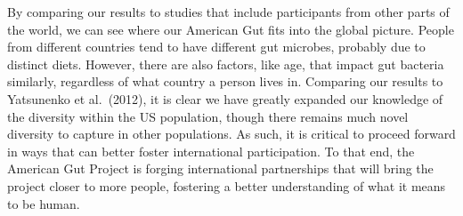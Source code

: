 \documentclass[10pt,letterpaper]{article}
\begin{document}
By comparing our results to studies that include participants from other parts of the world, we can see where our American Gut fits into the global picture.  People from different countries tend to have different gut microbes, probably due to distinct diets.  However, there are also factors, like age, that impact gut bacteria similarly, regardless of what country a person lives in.  Comparing our results to Yatsunenko et al.\ (2012), it is clear we have greatly expanded our knowledge of the diversity within the US population, though there remains much novel diversity to capture in other populations. As such, it is critical to proceed forward in ways that can better foster international participation. To that end, the American Gut Project is forging international partnerships that will bring the project closer to more people, fostering a better understanding of what it means to be human.
\end{document}
